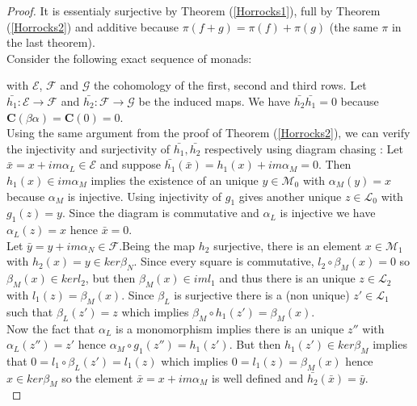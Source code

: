 \documentclass[
	oldfontcommands,
	sumario=abnt-6027-2012,
	12pt,			%
	openright,		%
	oneside,		%
	a4paper,		%
	english,		%
	brazil			%
	]{imecc-unicamp}
\begin{document}
\begin{proof}
It is essentialy surjective by Theorem (\ref{Horrocks1}), full by Theorem (\ref{Horrocks2}) and additive because $\pi(f+g)=\pi(f)+\pi(g)$ (the same $\pi$ in the last theorem). \\
Consider the following exact sequence of monads:
\begin{center}
\end{center}
with $\mathcal{E}$, $\mathcal{F}$ and $\mathcal{G}$ the cohomology of the first, second and third rows. Let $\bar{h_1}:\mathcal{E} \to \mathcal{F}$ and $\bar{h_2}:\mathcal{F} \to \mathcal{G}$ be the induced maps. We have $\bar{h_2} \bar{h_1}=0$ because $\textbf{C}(\beta \alpha)=\textbf{C}(0)=0$. \\
Using the same argument from the proof of Theorem (\ref{Horrocks2}), we can verify the injectivity and surjectivity of $\bar{h_1}, \bar{h_2}$ respectively using diagram chasing : Let $\bar{x}=x+im \alpha_L \in \mathcal{E}$ and suppose $\bar{h_1}(\bar{x})=h_1(x)+im\alpha_M=0$. Then $h_1(x) \in im \alpha_M$ implies the existence of an unique $y \in \mathcal{M}_0$ with $\alpha_M(y)=x$ because $\alpha_M$ is injective. Using injectivity of $g_1$ gives another unique $z \in \mathcal{L}_0$ with $g_1(z)=y$. Since the diagram is commutative and $\alpha_L$ is injective we have $\alpha_L(z)=x$ hence $\bar{x}=0$. \\
Let $\bar{y}=y+im\alpha_N \in \mathcal{F}$.Being the map $h_2$ surjective, there is an element $x \in \mathcal{M}_1$ with $h_2(x)=y \in ker \beta_N$. Since every square is commutative, $l_2 \circ \beta_M(x)=0$ so $\beta_M(x) \in ker l_2$, but then $\beta_M(x) \in im l_1$ and thus there is an unique $z \in \mathcal{L}_2$ with $l_1(z)=\beta_M(x)$. Since $\beta_L$ is surjective there is a (non unique) $z' \in \mathcal{L}_1$ such that $\beta_L(z')=z$ which implies $\beta_M \circ h_1(z')=\beta_M(x)$.\\ Now the fact that $\alpha_L$ is a monomorphism implies there is an unique $z''$ with $\alpha_L(z'')=z'$ hence $\alpha_M \circ g_1(z'')=h_1(z')$. But then $h_1(z') \in ker \beta_M$ implies that $0 = l_1 \circ\beta_L(z')=l_1(z)$ which implies $0 = l_1(z)=\beta_M(x)$ hence $x \in ker \beta_M$ so the element $\bar{x}=x+im \alpha_M$ is well defined and $\bar{h_2}(\bar{x})=\bar{y}$. \\

\end{proof}
\end{document}
